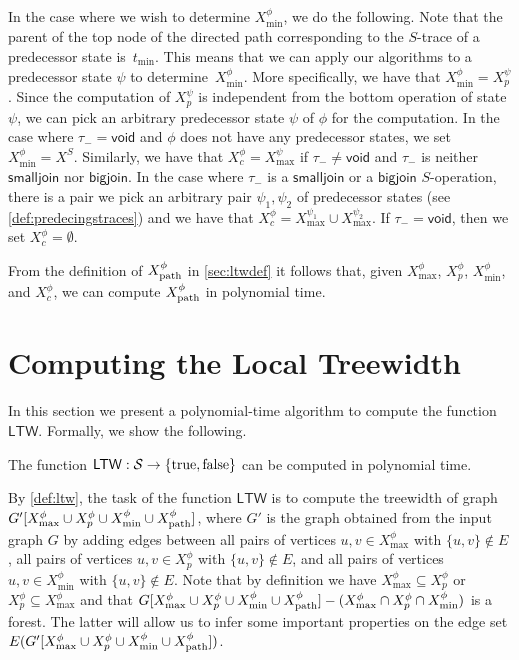 \documentclass[a4paper,UKenglish,cleveref, autoref, thm-restate, numberwithinsect]{lipics-v2021}
\newcounter{algorithm}
\newcommand{\bigjoin}{\mathsf{bigjoin}}
\newcommand{\smalljoin}{\mathsf{smalljoin}}
\newcommand{\void}{\mathsf{void}}
\newcommand{\ltw}{\mathsf{LTW}}
\newcommand{\dpath}{\textup{path}}
\newcommand{\true}{\textup{true}}
\newcommand{\false}{\textup{false}}
\begin{document}
In the case where we wish to determine $X^\phi_{\min}$, we do the following. Note that the parent of the top node of the directed path corresponding to the $S$-trace of a predecessor state is~$t_{\min}$. This means that we can apply our algorithms to a predecessor state $\psi$ to determine~$X^\phi_{\min}$. 
More specifically, we have that $X^\phi_{\min}=X_p^\psi$.
Since the computation of $X_p^\psi$ is independent from the bottom operation of state $\psi$, we can pick an arbitrary predecessor state $\psi$ of $\phi$ for the computation. In the case where $\tau_-=\void$ and $\phi$ does not have any predecessor states, we set $X^\phi_{\min}=X^S$. Similarly, we have that $X^\phi_c=X_{\max}^\psi$ if $\tau_-\neq\void$ and $\tau_-$ is neither $\smalljoin$ nor $\bigjoin$. In the case where $\tau_-$ is a $\smalljoin$ or a $\bigjoin$ $S$-operation, there is a pair we pick an arbitrary pair $\psi_1,\psi_2$ of predecessor states (see \cref{def:predecingstraces}) and we have that $X^\phi_c=X_{\max}^{\psi_1}\cup X_{\max}^{\psi_2}$. If $\tau_-=\void$, then we set $X^\phi_c=\emptyset$.



From the definition of $X^\phi_{\dpath}$ in \cref{sec:ltwdef} it follows that, given $X^\phi_{\max}$, $X^\phi_p$, $X^\phi_{\min}$, and $X^\phi_c$, we can compute $X^\phi_{\dpath}$ in polynomial time.









\section{Computing the Local Treewidth}\label{sec:localtw}
In this section we present a polynomial-time algorithm to compute the function $\ltw$. Formally, we show the following.

\begin{proposition}\label{prop:computeltw}
The function $\ltw:\mathcal{S}\rightarrow\{\true,\false\}$ can be computed in polynomial time.
\end{proposition}

By \cref{def:ltw}, the task of the function $\ltw$ is to compute the treewidth of graph $G'[X^\phi_{\max}\cup X^\phi_p\cup X^\phi_{\min}\cup X^\phi_{\dpath}]$, where $G'$ is the graph obtained from the input graph $G$ by adding edges between all pairs of vertices $u,v\in  X^\phi_{\max}$ with $\{u,v\}\notin E$, all pairs of vertices $u,v\in  X^\phi_p$ with $\{u,v\}\notin E$, and all pairs of vertices $u,v\in X^\phi_{\min}$ with $\{u,v\}\notin E$. Note that by definition we have $X^\phi_{\max}\subseteq X^\phi_p$ or $X^\phi_p\subseteq X^\phi_{\max}$ and that $G[X^\phi_{\max}\cup X^\phi_p\cup X^\phi_{\min}\cup X^\phi_{\dpath}]-(X^\phi_{\max}\cap X^\phi_p\cap X^\phi_{\min})$ is a forest.
The latter will allow us to infer some important properties on the edge set $E(G'[X^\phi_{\max}\cup X^\phi_p\cup X^\phi_{\min}\cup X^\phi_{\dpath}])$.
\end{document}
